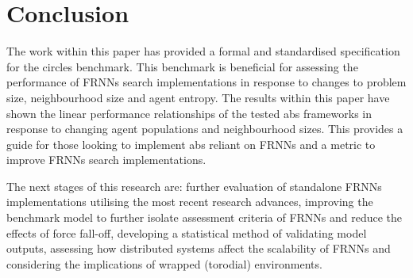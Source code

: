 \section{Conclusion\label{sec:conclusion}}
  The work within this paper has provided a formal and standardised specification for the circles benchmark. This benchmark is beneficial for assessing the performance of FRNNs search implementations in response to changes to problem size, neighbourhood size and agent entropy. The results within this paper have shown the linear performance relationships of the tested \gls{abs} frameworks in response to changing agent populations and neighbourhood sizes. This provides a guide for those looking to implement \gls{abs} reliant on FRNNs and a metric to improve FRNNs search implementations. 
  
  The next stages of this research are: further evaluation of standalone FRNNs implementations utilising the most recent research advances, improving the benchmark model to further isolate assessment criteria of FRNNs and reduce the effects of force fall-off, developing a statistical method of validating model outputs, assessing how distributed systems affect the scalability of FRNNs and considering the implications of wrapped (torodial) environments.